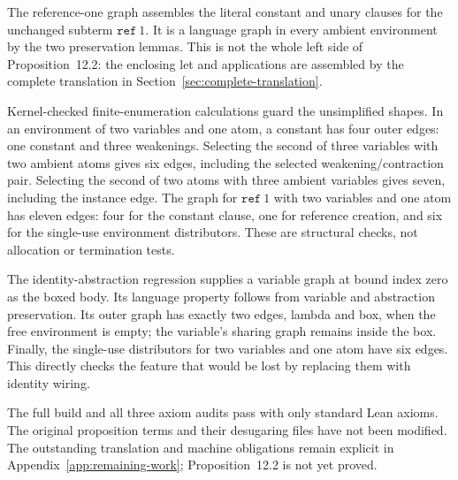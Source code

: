 The reference-one graph assembles the literal constant and unary clauses
for the unchanged subterm $\mathtt{ref}\ 1$. It is a language graph in every
ambient environment by the two preservation lemmas. This is not the whole
left side of Proposition~12.2: the enclosing let and applications are assembled by the complete translation
in Section~\ref{sec:complete-translation}.



Kernel-checked finite-enumeration calculations guard the unsimplified
shapes. In an environment of two variables and one atom, a constant has
four outer edges: one constant and three weakenings. Selecting the second
of three variables with two ambient atoms gives six edges, including the
selected weakening/contraction pair. Selecting the second of two atoms
with three ambient variables gives seven, including the instance edge.
The graph for $\mathtt{ref}\ 1$ with two variables and one atom has eleven
edges: four for the constant clause, one for reference creation, and six
for the single-use environment distributors. These are structural checks,
not allocation or termination tests.





The identity-abstraction regression supplies a variable graph at bound
index zero as the boxed body. Its language property follows from variable
and abstraction preservation. Its outer graph has exactly two edges, lambda
and box, when the free environment is empty; the variable's sharing graph
remains inside the box. Finally, the single-use distributors for two variables
and one atom have six edges. This directly checks the feature that would
be lost by replacing them with identity wiring.





The full build and all three axiom audits pass with only standard Lean
axioms. The original proposition terms and their desugaring files have not
been modified. The outstanding translation and machine obligations remain
explicit in Appendix~\ref{app:remaining-work}; Proposition~12.2 is not yet proved.

